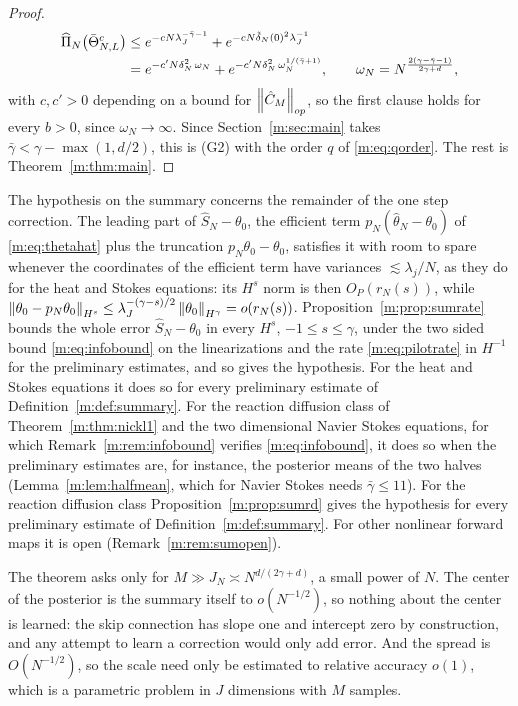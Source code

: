 \begin{proof}
\[
\begin{aligned}
\widehat\Pi_N\big(\bar\Theta^c_{N,L}\big)&\le e^{-cN\lambda_J^{-\bar\gamma-1}}+e^{-cN\tilde\delta_N(0)^2\lambda_J^{-1}}\\
&=e^{-c'N\delta_N^2\,\omega_N}+e^{-c'N\delta_N^2\,\omega_N^{1/(\bar\gamma+1)}},\qquad\omega_N=N^{\frac{2(\gamma-\bar\gamma-1)}{2\gamma+d}},
\end{aligned}
\]
with $c,c'>0$ depending on a bound for $\left\|\hat C_M\right\|_{op}$, so the first clause holds for every $b>0$, since $\omega_N\to\infty$. Since Section~\ref{m:sec:main} takes $\bar\gamma<\gamma-\max(1,d/2)$, this is (G2) with the order $q$ of \eqref{m:eq:qorder}. The rest is Theorem~\ref{m:thm:main}.
\end{proof}

The hypothesis on the summary concerns the remainder of the one step correction. The leading part of $\hat S_N-\theta_0$, the efficient term $p_N(\hat\theta_N-\theta_0)$ of \eqref{m:eq:thetahat} plus the truncation $p_N\theta_0-\theta_0$, satisfies it with room to spare whenever the coordinates of the efficient term have variances $\lesssim\lambda_j/N$, as they do for the heat and Stokes equations: its $H^s$ norm is then $O_P(r_N(s))$, while $\left\|\theta_0-p_N\theta_0\right\|_{H^s}\le\lambda_J^{-(\gamma-s)/2}\left\|\theta_0\right\|_{H^\gamma}=o(r_N(s))$. Proposition~\ref{m:prop:sumrate} bounds the whole error $\hat S_N-\theta_0$ in every $H^s$, $-1\le s\le\gamma$, under the two sided bound \eqref{m:eq:infobound} on the linearizations and the rate \eqref{m:eq:pilotrate} in $H^{-1}$ for the preliminary estimates, and so gives the hypothesis. For the heat and Stokes equations it does so for every preliminary estimate of Definition~\ref{m:def:summary}. For the reaction diffusion class of Theorem~\ref{m:thm:nickl1} and the two dimensional Navier Stokes equations, for which Remark~\ref{m:rem:infobound} verifies \eqref{m:eq:infobound}, it does so when the preliminary estimates are, for instance, the posterior means of the two halves (Lemma~\ref{m:lem:halfmean}, which for Navier Stokes needs $\bar\gamma\le11$). For the reaction diffusion class Proposition~\ref{m:prop:sumrd} gives the hypothesis for every preliminary estimate of Definition~\ref{m:def:summary}. For other nonlinear forward maps it is open (Remark~\ref{m:rem:sumopen}).

\begin{remark}
The theorem asks only for $M\gg J_N\asymp N^{d/(2\gamma+d)}$, a small power of $N$. The center of the posterior is the summary itself to $o(N^{-1/2})$, so nothing about the center is learned: the skip connection has slope one and intercept zero by construction, and any attempt to learn a correction would only add error. And the spread is $O(N^{-1/2})$, so the scale need only be estimated to relative accuracy $o(1)$, which is a parametric problem in $J$ dimensions with $M$ samples.
\end{remark}

